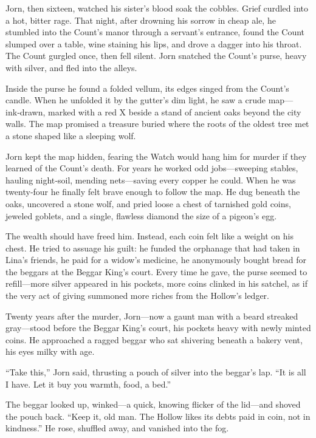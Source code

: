 \documentclass[11pt]{article}
\begin{document}
Jorn, then sixteen, watched his sister’s blood soak the cobbles. Grief curdled into a hot, bitter rage. That night, after drowning his sorrow in cheap ale, he stumbled into the Count’s manor through a servant’s entrance, found the Count slumped over a table, wine staining his lips, and drove a dagger into his throat. The Count gurgled once, then fell silent. Jorn snatched the Count’s purse, heavy with silver, and fled into the alleys.

Inside the purse he found a folded vellum, its edges singed from the Count’s candle. When he unfolded it by the gutter’s dim light, he saw a crude map—ink‑drawn, marked with a red X beside a stand of ancient oaks beyond the city walls. The map promised a treasure buried where the roots of the oldest tree met a stone shaped like a sleeping wolf.

Jorn kept the map hidden, fearing the Watch would hang him for murder if they learned of the Count’s death. For years he worked odd jobs—sweeping stables, hauling night‑soil, mending nets—saving every copper he could. When he was twenty‑four he finally felt brave enough to follow the map. He dug beneath the oaks, uncovered a stone wolf, and pried loose a chest of tarnished gold coins, jeweled goblets, and a single, flawless diamond the size of a pigeon’s egg.

The wealth should have freed him. Instead, each coin felt like a weight on his chest. He tried to assuage his guilt: he funded the orphanage that had taken in Lina’s friends, he paid for a widow’s medicine, he anonymously bought bread for the beggars at the Beggar King’s court. Every time he gave, the purse seemed to refill—more silver appeared in his pockets, more coins clinked in his satchel, as if the very act of giving summoned more riches from the Hollow’s ledger.

Twenty years after the murder, Jorn—now a gaunt man with a beard streaked gray—stood before the Beggar King’s court, his pockets heavy with newly minted coins. He approached a ragged beggar who sat shivering beneath a bakery vent, his eyes milky with age.

“Take this,” Jorn said, thrusting a pouch of silver into the beggar’s lap. “It is all I have. Let it buy you warmth, food, a bed.”

The beggar looked up, winked—a quick, knowing flicker of the lid—and shoved the pouch back. “Keep it, old man. The Hollow likes its debts paid in coin, not in kindness.” He rose, shuffled away, and vanished into the fog.
\end{document}
